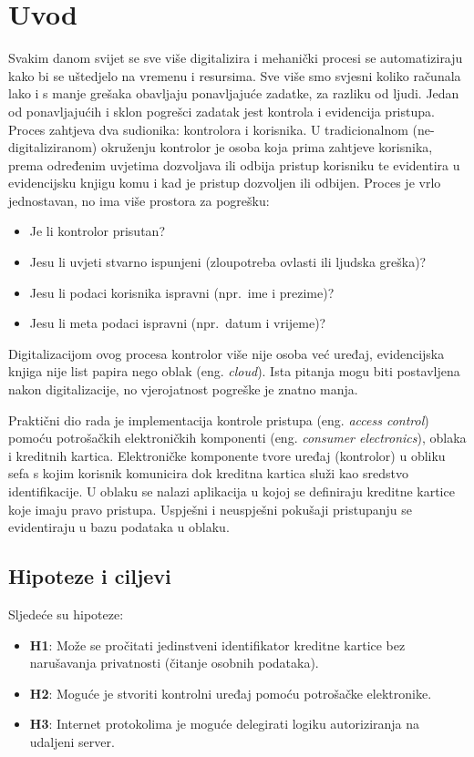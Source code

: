 \chapter{Uvod}

Svakim danom svijet se sve više digitalizira i mehanički procesi se automatiziraju kako bi se uštedjelo na vremenu i resursima.
Sve više smo svjesni koliko računala lako i s manje grešaka obavljaju ponavljajuće zadatke, za razliku od ljudi.
Jedan od ponavljajućih i sklon pogrešci zadatak jest kontrola i evidencija pristupa.
Proces zahtjeva dva sudionika: kontrolora i korisnika.
U tradicionalnom (ne-digitaliziranom) okruženju kontrolor je osoba koja prima zahtjeve korisnika, prema određenim uvjetima
dozvoljava ili odbija pristup korisniku te evidentira u evidencijsku knjigu komu i kad je pristup dozvoljen ili odbijen.
Proces je vrlo jednostavan, no ima više prostora za pogrešku:
\begin{itemize}
    \item Je li kontrolor prisutan?
    \item Jesu li uvjeti stvarno ispunjeni (zloupotreba ovlasti ili ljudska greška)?
    \item Jesu li podaci korisnika ispravni (npr.\ ime i prezime)?
    \item Jesu li meta podaci ispravni (npr.\ datum i vrijeme)?
\end{itemize}
Digitalizacijom ovog procesa kontrolor više nije osoba već uređaj, evidencijska knjiga nije list papira nego oblak (eng. \textit{cloud}).
Ista pitanja mogu biti postavljena nakon digitalizacije, no vjerojatnost pogreške je znatno manja.

Praktični dio rada je implementacija kontrole pristupa (eng. \textit{access control}) pomoću potrošačkih elektroničkih
komponenti (eng. \textit{consumer electronics}), oblaka i kreditnih kartica.
Elektroničke komponente tvore uređaj (kontrolor) u obliku sefa s kojim korisnik komunicira dok kreditna kartica služi kao sredstvo identifikacije.
U oblaku se nalazi aplikacija u kojoj se definiraju kreditne kartice koje imaju pravo pristupa.
Uspješni i neuspješni pokušaji pristupanju se evidentiraju u bazu podataka u oblaku.

\section{Hipoteze i ciljevi}

Sljedeće su hipoteze:

\begin{itemize}
    \item \textbf{H1}: Može se pročitati jedinstveni identifikator kreditne kartice bez narušavanja privatnosti (čitanje osobnih podataka).
    \item \textbf{H2}: Moguće je stvoriti kontrolni uređaj pomoću potrošačke elektronike.
    \item \textbf{H3}: Internet protokolima je moguće delegirati logiku autoriziranja na udaljeni server.
\end{itemize}

